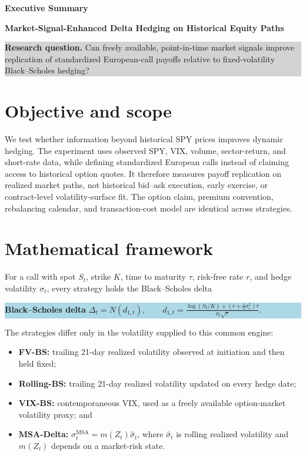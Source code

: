 \documentclass[10pt]{article}
\newcommand{\formula}[2]{%
  \colorbox{lightblue}{%
    \parbox{0.965\linewidth}{\textcolor{erdosblue}{\textbf{#1}}\quad #2}%
  }%
}
\begin{document}
{\LARGE\bfseries\color{erdosblue} Executive Summary}\par
\vspace{2pt}
{\large\bfseries Market-Signal-Enhanced Delta Hedging on Historical Equity Paths}\par
\vspace{5pt}

\colorbox{lightgray}{\parbox{0.965\linewidth}{%
\textbf{Research question.} Can freely available, point-in-time market signals
improve replication of standardized European-call payoffs relative to
fixed-volatility Black--Scholes hedging?}}

\section{Objective and scope}

We test whether information beyond historical SPY prices improves dynamic
hedging. The experiment uses observed SPY, VIX, volume, sector-return, and
short-rate data, while defining standardized European calls instead of claiming
access to historical option quotes. It therefore measures payoff replication on
realized market paths, not historical bid--ask execution, early exercise, or
contract-level volatility-surface fit. The option claim, premium convention,
rebalancing calendar, and transaction-cost model are identical across
strategies.

\section{Mathematical framework}

For a call with spot $S_t$, strike $K$, time to maturity $\tau$, risk-free rate
$r$, and hedge volatility $\sigma_t$, every strategy holds the Black--Scholes
delta

\formula{Black--Scholes delta}{%
$\displaystyle \Delta_t=N(d_{1,t}),\qquad
d_{1,t}=\frac{\log(S_t/K)+(r+\tfrac12\sigma_t^2)\tau}
{\sigma_t\sqrt{\tau}}.$}

The strategies differ only in the volatility supplied to this common engine:

\begin{itemize}
  \item \textbf{FV-BS:} trailing 21-day realized volatility observed at
  initiation and then held fixed;
  \item \textbf{Rolling-BS:} trailing 21-day realized volatility updated on
  every hedge date;
  \item \textbf{VIX-BS:} contemporaneous VIX, used as a freely available
  option-market volatility proxy; and
  \item \textbf{MSA-Delta:} $\sigma_t^{\mathrm{MSA}}=m(Z_t)\widehat\sigma_t$,
  where $\widehat\sigma_t$ is rolling realized volatility and $m(Z_t)$ depends
  on a market-risk state.
\end{itemize}
\end{document}
